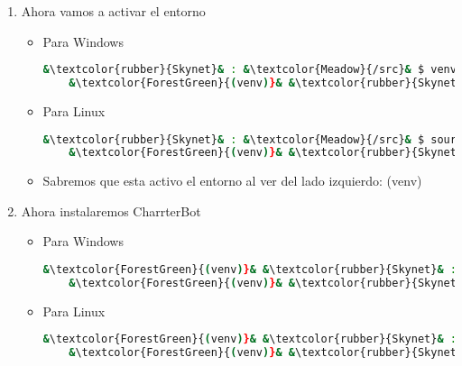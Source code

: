 \documentclass[a4paper,12pt]{article}
\begin{document}
\begin{enumerate}
\item Ahora vamos a activar el entorno

\begin{itemize}
    \item Para Windows
\begin{lstlisting}[language=bash]    
    &\textcolor{rubber}{Skynet}& : &\textcolor{Meadow}{/src}& $ venv\Scripts\activate
    &\textcolor{ForestGreen}{(venv)}& &\textcolor{rubber}{Skynet}& : &\textcolor{Meadow}{/src}& $
\end{lstlisting}
\item Para Linux
\begin{lstlisting}[language=bash]    
    &\textcolor{rubber}{Skynet}& : &\textcolor{Meadow}{/src}& $ source_venv/bin/activate
    &\textcolor{ForestGreen}{(venv)}& &\textcolor{rubber}{Skynet}& : &\textcolor{Meadow}{/src}& $
\end{lstlisting}

\item Sabremos que esta activo el entorno al ver del lado izquierdo: (venv)

\end{itemize}

\item Ahora instalaremos CharrterBot

\begin{itemize}
    \item Para Windows
\begin{lstlisting}[language=bash]    
    &\textcolor{ForestGreen}{(venv)}& &\textcolor{rubber}{Skynet}& : &\textcolor{Meadow}{/src}& $ python -m pip install chatterbot==1.0.4 pytz
    &\textcolor{ForestGreen}{(venv)}& &\textcolor{rubber}{Skynet}& : &\textcolor{Meadow}{/src}& $
\end{lstlisting}
\item Para Linux
\begin{lstlisting}[language=bash]    
    &\textcolor{ForestGreen}{(venv)}& &\textcolor{rubber}{Skynet}& : &\textcolor{Meadow}{/src}& $ python -m pip install chatterbot==1.0.4 pytz
    &\textcolor{ForestGreen}{(venv)}& &\textcolor{rubber}{Skynet}& : &\textcolor{Meadow}{/src}& $
\end{lstlisting}
\end{itemize}


\end{enumerate}
\end{document}
